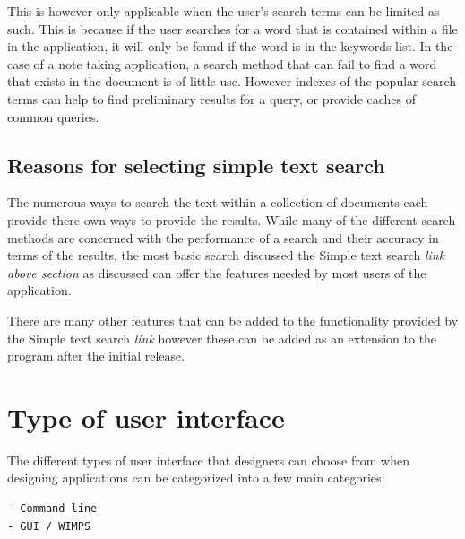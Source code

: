 This is however only applicable when the user's search terms can be limited as
such. This is because if the user searches for a word that is contained within a
file in the application, it will only be found if the word is in the keywords
list. In the case of a note taking application, a search method that can fail to
find a word that exists in the  document is of little use. However indexes of
the popular search terms can help to find preliminary results for a query, or
provide caches of common queries.




\subsection{Reasons for selecting simple text
search}\label{reasons-for-selecting-simple-text-search}

The numerous ways to search the text within a collection of documents
each provide there own ways to provide the results. While many of the
different search methods are concerned with the performance of a search
and their accuracy in terms of the results, the most basic search
discussed the Simple text search \emph{link above section} as discussed
can offer the features needed by most users of the application.

There are many other features that can be added to the functionality
provided by the Simple text search \emph{link} however these can be
added as an extension to the program after the initial release.

\section{Type of user interface}\label{type-of-user-interface}

The different types of user interface that designers can choose from
when designing applications can be categorized into a few main
categories:

\begin{verbatim}
- Command line
- GUI / WIMPS
\end{verbatim}

